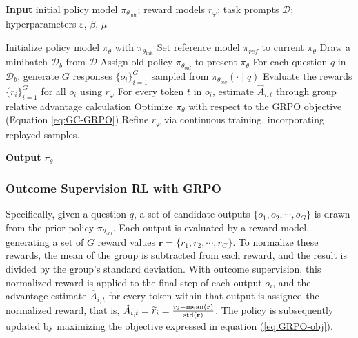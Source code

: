 \begin{itemize}[topsep=0pt]
\begin{algorithm}[t]
  \small
  \caption{Iterative Group Relative Policy Optimization}
  \textbf{Input} initial policy model $\pi_{\theta_{\text{init}}}$; reward models $r_\varphi$; task prompts $\mathcal{D}$; 
  hyperparameters $\varepsilon$, $\beta$, $\mu$
  \begin{algorithmic}[1]
    \State Initialize policy model $\pi_\theta$ with $\pi_{\theta_{\text{init}}}$
       \State Set reference model $\pi_{ref}$ to current $\pi_{\theta}$
      \State Draw a minibatch $\mathcal{D}_b$ from $\mathcal{D}$
      \State Assign old policy $\pi_{\theta_{old}}$ to present $\pi_\theta$
      \State For each question $q$ in $\mathcal{D}_b$, generate $G$ responses $\{o_i\}_{i=1}^G$ sampled from $\pi_{\theta_{old}} (\cdot \mid q)$
      \State Evaluate the rewards $\{r_i\}_{i=1}^{G}$ for all $o_i$ using $r_{\varphi}$
      \State For every token $t$ in $o_i$, estimate $\hat{A}_{i,t}$ through group relative advantage calculation
        \State Optimize $\pi_\theta$ with respect to the GRPO objective (Equation \ref{eq:GC-GRPO})
      \EndFor
    \EndFor
    \State Refine $r_\varphi$ via continuous training, incorporating replayed samples.
    \EndFor
  \end{algorithmic}
  \textbf{Output} $\pi_\theta$
  \label{alg:iter-grpo}
\end{algorithm}

\subsubsection{Outcome Supervision RL with GRPO} Specifically, given a question $q$, a set of candidate outputs $\{o_1, o_2, \cdots, o_G\}$ is drawn from the prior policy $\pi_{\theta_{old}}$. Each output is evaluated by a reward model, generating a set of $G$ reward values $\mathbf{r} = \{r_1, r_2, \cdots, r_G\}$. To normalize these rewards, the mean of the group is subtracted from each reward, and the result is divided by the group's standard deviation. With outcome supervision, this normalized reward is applied to the final step of each output $o_i$, and the advantage estimate $\hat{A}_{i, t}$ for every token within that output is assigned the normalized reward, that is, $\hat{A}_{i, t} = \widetilde{r}_i = \frac{r_i - {\rm mean}(\mathbf{r})}{{\rm std}(\mathbf{r})}$. The policy is subsequently updated by maximizing the objective expressed in equation (\ref{eq:GRPO-obj}).


\end{itemize}
